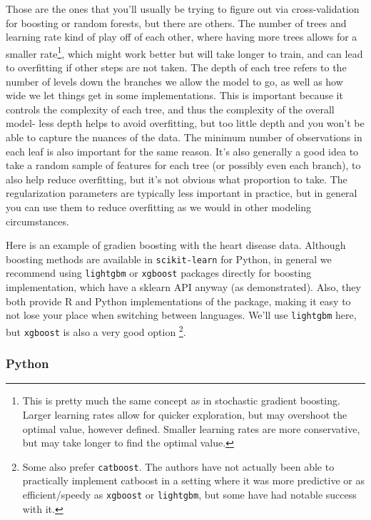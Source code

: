 \documentclass[
  letterpaper,
]{krantz}
\begin{document}
Those are the ones that you'll usually be trying to figure out via
cross-validation for boosting or random forests, but there are others.
The number of trees and learning rate kind of play off of each other,
where having more trees allows for a smaller rate\footnote{This is
  pretty much the same concept as in stochastic gradient boosting.
  Larger learning rates allow for quicker exploration, but may overshoot
  the optimal value, however defined. Smaller learning rates are more
  conservative, but may take longer to find the optimal value.}, which
might work better but will take longer to train, and can lead to
overfitting if other steps are not taken. The depth of each tree refers
to the number of levels down the branches we allow the model to go, as
well as how wide we let things get in some implementations. This is
important because it controls the complexity of each tree, and thus the
complexity of the overall model- less depth helps to avoid overfitting,
but too little depth and you won't be able to capture the nuances of the
data. The minimum number of observations in each leaf is also important
for the same reason. It's also generally a good idea to take a random
sample of features for each tree (or possibly even each branch), to also
help reduce overfitting, but it's not obvious what proportion to take.
The regularization parameters are typically less important in practice,
but in general you can use them to reduce overfitting as we would in
other modeling circumstances.

Here is an example of gradien boosting with the heart disease data.
Although boosting methods are available in \texttt{scikit-learn} for
Python, in general we recommend using \texttt{lightgbm} or
\texttt{xgboost} packages directly for boosting implementation, which
have a sklearn API anyway (as demonstrated). Also, they both provide R
and Python implementations of the package, making it easy to not lose
your place when switching between languages. We'll use \texttt{lightgbm}
here, but \texttt{xgboost} is also a very good option \footnote{Some
  also prefer \texttt{catboost}. The authors have not actually been able
  to practically implement catboost in a setting where it was more
  predictive or as efficient/speedy as \texttt{xgboost} or
  \texttt{lightgbm}, but some have had notable success with it.}.

\subsubsection{Python}
\end{document}
